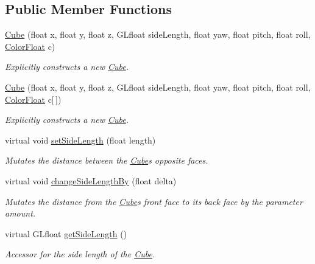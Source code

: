 \subsection*{Public Member Functions}
\begin{DoxyCompactItemize}
\item 
\hyperlink{classtsgl_1_1_cube_a44a6d1678cd6724d1039b2076e6dcedc}{Cube} (float x, float y, float z, G\+Lfloat side\+Length, float yaw, float pitch, float roll, \hyperlink{structtsgl_1_1_color_float}{Color\+Float} c)
\begin{DoxyCompactList}\small\item\em Explicitly constructs a new \hyperlink{classtsgl_1_1_cube}{Cube}. \end{DoxyCompactList}\item 
\hyperlink{classtsgl_1_1_cube_a19730ea6cdd6888c586f25a168651868}{Cube} (float x, float y, float z, G\+Lfloat side\+Length, float yaw, float pitch, float roll, \hyperlink{structtsgl_1_1_color_float}{Color\+Float} c\mbox{[}$\,$\mbox{]})
\begin{DoxyCompactList}\small\item\em Explicitly constructs a new \hyperlink{classtsgl_1_1_cube}{Cube}. \end{DoxyCompactList}\item 
virtual void \hyperlink{classtsgl_1_1_cube_ae3020b2e435f7c39fae71ea4efcc2f6c}{set\+Side\+Length} (float length)
\begin{DoxyCompactList}\small\item\em Mutates the distance between the \hyperlink{classtsgl_1_1_cube}{Cube}\textquotesingle{}s opposite faces. \end{DoxyCompactList}\item 
virtual void \hyperlink{classtsgl_1_1_cube_a63281031d311a71cf111913f518b66f5}{change\+Side\+Length\+By} (float delta)
\begin{DoxyCompactList}\small\item\em Mutates the distance from the \hyperlink{classtsgl_1_1_cube}{Cube}\textquotesingle{}s front face to its back face by the parameter amount. \end{DoxyCompactList}\item 
virtual G\+Lfloat \hyperlink{classtsgl_1_1_cube_a4dd172e48230f83a70a09e3f3740265d}{get\+Side\+Length} ()
\begin{DoxyCompactList}\small\item\em Accessor for the side length of the \hyperlink{classtsgl_1_1_cube}{Cube}. \end{DoxyCompactList}\item 

\end{DoxyCompactItemize}
